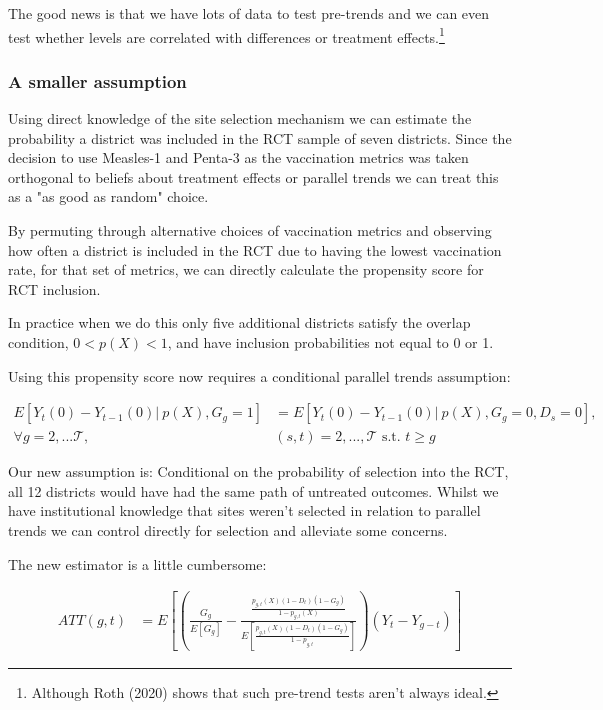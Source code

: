 \documentclass{article}
\begin{document}
   The good news is that we have lots of data to test pre-trends and we can even 
   test whether levels are correlated with differences or treatment effects.\footnote{Although 
   Roth (2020) shows that such pre-trend tests aren't always ideal.}

   \subsubsection*{A smaller assumption}

   Using direct knowledge of the site selection mechanism we can estimate the 
   probability a district was included in the RCT sample of seven districts. Since the 
   decision to use Measles-1 and Penta-3 as the vaccination metrics was taken 
   orthogonal to beliefs about treatment effects or parallel trends we can 
   treat this as a "as good as random" choice.  

   By permuting through alternative choices of vaccination metrics and observing 
   how often a district is included in the RCT due to having the lowest vaccination 
   rate, for that set of metrics, we can directly calculate the propensity 
   score for RCT inclusion.
   
   In practice when we do this only five additional districts satisfy the overlap 
   condition, $0 < p(X) < 1$, and have inclusion probabilities not equal to 0 or 1. 

   Using this propensity score now requires a conditional parallel trends assumption:

   


\begin{align*}
   E\left[Y_t(0) - Y_{t-1}(0) |\  p(X), G_g = 1\right] &= 
   E\left[
      Y_t(0) - Y_{t-1}(0) |\  p(X), G_g  = 0 , D_s = 0
   \right],  \\ \forall g = 2, ... \mathcal{T}, & (s,t) = 2, ..., \mathcal{T} \text{ s.t. } t \geq g
\end{align*}


Our new assumption is: Conditional on the probability of selection into the RCT, 
all 12 districts would have had the same path of untreated outcomes. Whilst 
we have institutional knowledge that sites weren't selected in relation to 
parallel trends we can control directly for selection and alleviate some concerns. 

The new estimator is a little cumbersome:

\begin{align*}
  ATT(g,t) &= E\left[
     \left(
   \frac{G_g}{E[G_g]} -
   \frac{\frac{
      p_{g,t}(X)(1 - D_t)(1 - G_g)
   }{
      1 - p_{g,t}(X)
   }}{
  E\left[    \frac{
   p_{g,t}(X)(1 - D_t)(1 - G_g)
      }{1 - p_{g,t}}
   \right]
      }
     \right)
     (Y_t - Y_{g-t})
  \right] 
\end{align*}
\end{document}
